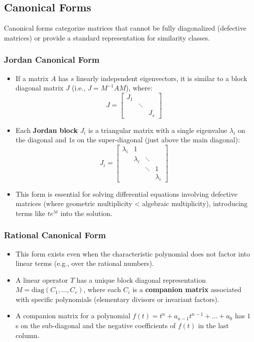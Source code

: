 \documentclass{article}
\begin{document}
\subsection{Canonical Forms}
Canonical forms categorize matrices that cannot be fully diagonalized (defective matrices) or provide a standard representation for similarity classes.

\subsubsection{Jordan Canonical Form}
\begin{itemize}
    \item If a matrix $A$ has $s$ linearly independent eigenvectors, it is similar to a block diagonal matrix $J$ (i.e., $J = M^{-1}AM$), where:
        \[ J = \begin{bmatrix} J_1 & & \\ & \ddots & \\ & & J_s \end{bmatrix} \]
    \item Each \textbf{Jordan block} $J_i$ is a triangular matrix with a single eigenvalue $\lambda_i$ on the diagonal and $1$s on the super-diagonal (just above the main diagonal):
        \[ J_i = \begin{bmatrix} \lambda_i & 1 & & \\ & \lambda_i & \ddots & \\ & & \ddots & 1 \\ & & & \lambda_i \end{bmatrix} \]
    \item This form is essential for solving differential equations involving defective matrices (where geometric multiplicity < algebraic multiplicity), introducing terms like $t e^{\lambda t}$ into the solution.
\end{itemize}

\subsubsection{Rational Canonical Form}
\begin{itemize}
    \item This form exists even when the characteristic polynomial does not factor into linear terms (e.g., over the rational numbers).
    \item A linear operator $T$ has a unique block diagonal representation $M = \text{diag}(C_1, \dots, C_r)$, where each $C_i$ is a \textbf{companion matrix} associated with specific polynomials (elementary divisors or invariant factors).
    \item A companion matrix for a polynomial $f(t) = t^n + a_{n-1}t^{n-1} + \dots + a_0$ has $1$s on the sub-diagonal and the negative coefficients of $f(t)$ in the last column.
\end{itemize}
\end{document}
